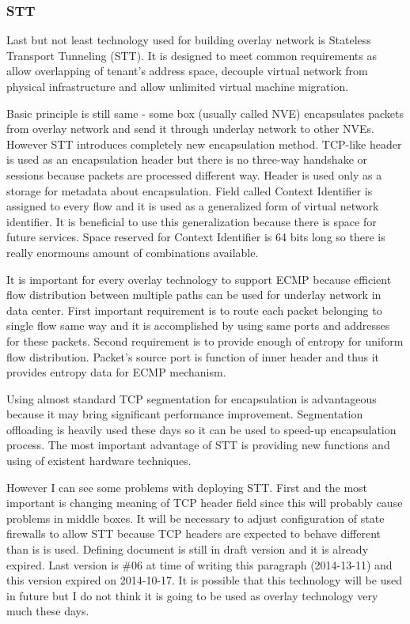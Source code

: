 \subsubsection{STT}
Last but not least technology used for building overlay network is Stateless Transport Tunneling (\Ac{STT}). It is designed to meet common requirements as allow overlapping of tenant's address space, decouple virtual network from physical infrastructure and allow unlimited virtual machine migration.

Basic principle is still same - some box (usually called \Ac{NVE}) encapsulates packets from overlay network and send it through underlay network to other \Ac{NVE}s. However \Ac{STT} introduces completely new encapsulation method. \Ac{TCP}-like header is used as an encapsulation header but there is no three-way handshake or sessions because packets are processed different way. Header is used only as a storage for metadata about encapsulation. Field called Context Identifier is assigned to every flow and it is used as a generalized form of virtual network identifier. \cite{draft-stt} It is beneficial to use this generalization because there is space for future services. Space reserved for Context Identifier is 64 bits long so there is really enormouns amount of combinations available.

It is important for every overlay technology to support \Ac{ECMP} because efficient flow distribution between multiple paths can be used for underlay network in data center. First important requirement is to route each packet belonging to single flow same way and it is accomplished by using same ports and addresses for these packets. 
Second requirement is to provide enough of entropy for uniform flow distribution. Packet's source port is function of inner header and thus it provides entropy data for \Ac{ECMP} mechanism.

Using almost standard \Ac{TCP} segmentation for encapsulation is advantageous because it may bring significant performance improvement. Segmentation offloading is heavily used these days so it can be used to speed-up encapsulation process. The most important advantage of \Ac{STT} is providing new functions and using of existent hardware techniques.

However I can see some problems with deploying \Ac{STT}. First and the most important is changing meaning of \Ac{TCP} header field since this will probably cause problems in middle boxes. It will be necessary to adjust configuration of state firewalls to allow \Ac{STT} because \Ac{TCP} headers are expected to behave different than is is used. Defining document \cite{draft-stt} is still in draft version and it is already expired. Last version is \#06 at time of writing this paragraph (2014-13-11) and this version expired on 2014-10-17. It is possible that this technology will be used in future but I do not think it is going to be used as overlay technology very much these days.

